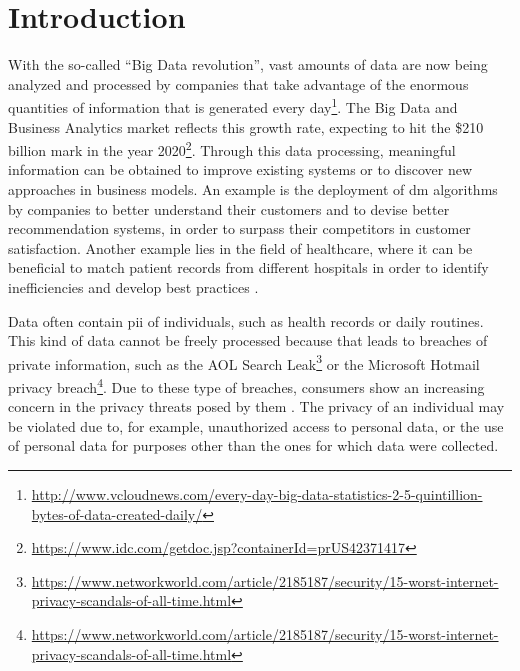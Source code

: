 %

\acresetall

\chapter{Introduction}
\label{ch:Introduction}



With the so-called ``Big Data revolution'', vast amounts of data are now being analyzed and processed by companies that take advantage of the enormous quantities of information that is generated every day\footnote{\url{http://www.vcloudnews.com/every-day-big-data-statistics-2-5-quintillion-bytes-of-data-created-daily/}}. The Big Data and Business Analytics market reflects this growth rate, expecting to hit the \$210 billion mark in the year 2020\footnote{\url{https://www.idc.com/getdoc.jsp?containerId=prUS42371417}}.
Through this data processing, meaningful information can be obtained to improve existing systems or to discover new approaches in business models. An example is the deployment of \ac{dm} algorithms by companies to better understand their customers and to devise better recommendation systems, in order to surpass their competitors in customer satisfaction. Another example lies in the field of healthcare, where it can be beneficial to match patient records from different hospitals in order to identify inefficiencies and develop best practices \cite{Lu2014}. 

Data often contain \ac{pii} of individuals, such as health records or daily routines. This kind of data cannot be freely processed because that leads to breaches of private information, such as the AOL Search Leak\footnote{\url{https://www.networkworld.com/article/2185187/security/15-worst-internet-privacy-scandals-of-all-time.html}} or the Microsoft Hotmail privacy breach\footnote{\url{https://www.networkworld.com/article/2185187/security/15-worst-internet-privacy-scandals-of-all-time.html}}. Due to these type of breaches, consumers show an increasing concern in the privacy threats posed by them \cite{brankovic1999privacy}. The privacy of an individual may be violated due to, for example, unauthorized access to personal data, or the use of personal data for purposes other than the ones for which data were collected.

